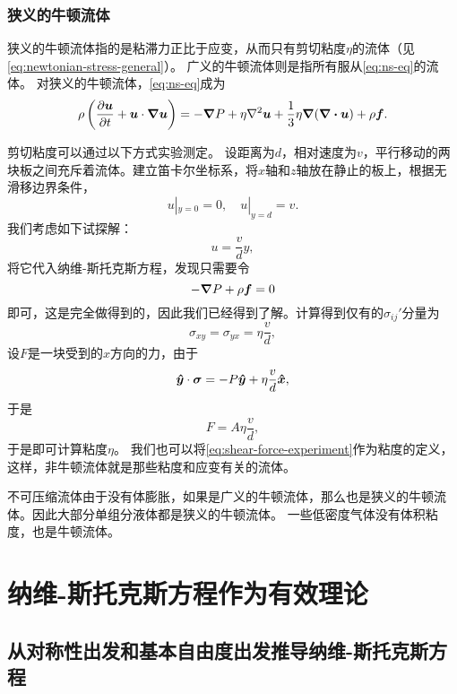 \subsubsection{狭义的牛顿流体}

狭义的牛顿流体指的是粘滞力正比于应变，从而只有剪切粘度$\eta$的流体（见\eqref{eq:newtonian-stress-general}）。
广义的牛顿流体则是指所有服从\eqref{eq:ns-eq}的流体。
对狭义的牛顿流体，\eqref{eq:ns-eq}成为
\begin{equation}
    \rho \left( \pdv{\vb*{u}}{t} + \vb*{u} \cdot \grad \vb*{u} \right) = - \grad{P} + \eta \laplacian \vb*{u} + \frac{1}{3} \eta \grad{(\div{\vb*{u}})} + \rho \vb*{f}.
\end{equation}

剪切粘度可以通过以下方式实验测定。
设距离为$d$，相对速度为$v$，平行移动的两块板之间充斥着流体。建立笛卡尔坐标系，将$x$轴和$z$轴放在静止的板上，根据无滑移边界条件，
\begin{equation}
    u|_{y=0} = 0, \quad u|_{y=d} = v.
\end{equation}
我们考虑如下试探解：
\begin{equation}
    u = \frac{v}{d} y,
\end{equation}
将它代入纳维-斯托克斯方程，发现只需要令
\begin{equation}
    - \grad{P} + \rho \vb*{f} = 0
\end{equation}
即可，这是完全做得到的，因此我们已经得到了解。计算得到仅有的$\sigma_{ij}'$分量为
\begin{equation}
    \sigma_{xy} = \sigma_{yx} = \eta \frac{v}{d},
\end{equation}
设$F$是一块受到的$x$方向的力，由于
\[
    \vu*{y} \cdot \vb*{\sigma} = - P \vu*{y} + \eta \frac{v}{d} \vu*{x},
\]
于是
\begin{equation}
    F = A \eta \frac{v}{d},
    \label{eq:shear-force-experiment}
\end{equation}
于是即可计算粘度$\eta$。
我们也可以将\eqref{eq:shear-force-experiment}作为粘度的定义，这样，非牛顿流体就是那些粘度和应变有关的流体。

不可压缩流体由于没有体膨胀，如果是广义的牛顿流体，那么也是狭义的牛顿流体。因此大部分单组分液体都是狭义的牛顿流体。
一些低密度气体没有体积粘度，也是牛顿流体。

\section{纳维-斯托克斯方程作为有效理论}

\subsection{从对称性出发和基本自由度出发推导纳维-斯托克斯方程}\label{sec:ns-from-sym}

